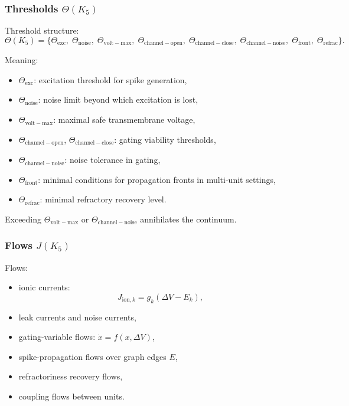\subsubsection{Thresholds \texorpdfstring{$\Theta(K_5)$}{\Theta(K_5)}}

Threshold structure:
\[
\Theta(K_5)=\{
\Theta_{\mathrm{exc}},\;
\Theta_{\mathrm{noise}},\;
\Theta_{\mathrm{volt-max}},\;
\Theta_{\mathrm{channel-open}},\;
\Theta_{\mathrm{channel-close}},\;
\Theta_{\mathrm{channel-noise}},\;
\Theta_{\mathrm{front}},\;
\Theta_{\mathrm{refrac}}
\}.
\]

Meaning:
\begin{itemize}
    \item $\Theta_{\mathrm{exc}}$: excitation threshold for spike
          generation,
    \item $\Theta_{\mathrm{noise}}$: noise limit beyond which excitation
          is lost,
    \item $\Theta_{\mathrm{volt-max}}$: maximal safe transmembrane
          voltage,
    \item $\Theta_{\mathrm{channel-open}}$, $\Theta_{\mathrm{channel-close}}$:
          gating viability thresholds,
    \item $\Theta_{\mathrm{channel-noise}}$: noise tolerance in gating,
    \item $\Theta_{\mathrm{front}}$: minimal conditions for propagation
          fronts in multi-unit settings,
    \item $\Theta_{\mathrm{refrac}}$: minimal refractory recovery level.
\end{itemize}

Exceeding $\Theta_{\mathrm{volt-max}}$ or $\Theta_{\mathrm{channel-noise}}$
annihilates the continuum.

\subsubsection{Flows \texorpdfstring{$J(K_5)$}{J(K_5)}}

Flows:
\begin{itemize}
    \item ionic currents:
    \[
    J_{\mathrm{ion},k} = g_k(\Delta V - E_k),
    \]
    \item leak currents and noise currents,
    \item gating-variable flows:
          $\dot{x} = f(x,\Delta V)$,
    \item spike-propagation flows over graph edges $E$,
    \item refractoriness recovery flows,
    \item coupling flows between units.
\end{itemize}

